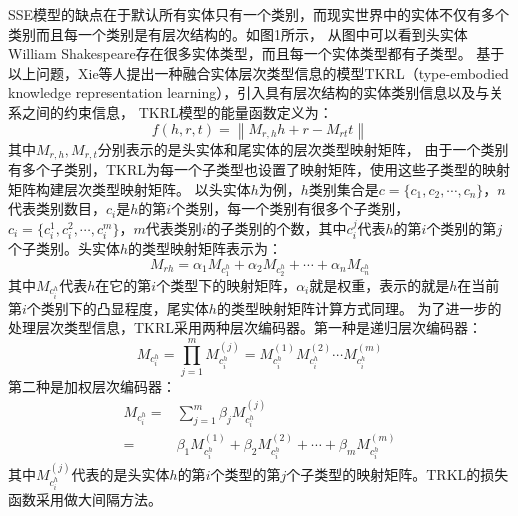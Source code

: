 \documentclass[twocolumn]{article}
\newcommand{\upcite}[1]{\textsuperscript{\textsuperscript{\cite{#1}}}}
\begin{document}
	SSE模型的缺点在于默认所有实体只有一个类别，而现实世界中的实体不仅有多个类别而且每一个类别是有层次结构的。如图1所示，
	从图中可以看到头实体William Shakespeare存在很多实体类型，而且每一个实体类型都有子类型。
	基于以上问题，Xie等人\upcite{TKRL}提出一种融合实体层次类型信息的模型TKRL（type-embodied knowledge representation learning），引入具有层次结构的实体类别信息以及与关系之间的约束信息，
	TKRL模型的能量函数定义为：
	\begin{equation}
		f(h,r,t)=\left \| M_{r,h}h+r-M_{rt}t \right \|
	\end{equation}
	其中$M_{r,h},M_{r,t}$分别表示的是头实体和尾实体的层次类型映射矩阵，
	由于一个类别有多个子类别，TKRL为每一个子类型也设置了映射矩阵，使用这些子类型的映射矩阵构建层次类型映射矩阵。
	以头实体$h$为例，$h$类别集合是$c=\{c_1,c_2,\cdots,c_n\}$，$n$代表类别数目，$c_i$是$h$的第$i$个类别，每一个类别有很多个子类别，$c_i=\{c_i^1,c_i^2,\cdots,c_i^m\}$，$m$代表类别$i$的子类别的个数，其中$c_i^j$代表$h$的第$i$个类别的第$j$个子类别。头实体$h$的类型映射矩阵表示为：
	\begin{equation}
		M_{rh}=\alpha_1 M_{c_1^h}+\alpha_2 M_{c_2^h}+\cdots+\alpha_n M_{c_n^h}
	\end{equation}
	其中$M_{c_i^h}$代表$h$在它的第$i$个类型下的映射矩阵，$\alpha_i$就是权重，表示的就是$h$在当前第$i$个类别下的凸显程度，尾实体$h$的类型映射矩阵计算方式同理。
	为了进一步的处理层次类型信息，TKRL采用两种层次编码器。第一种是递归层次编码器：
	\begin{equation}
		M_{c_i^h}=\prod_{j=1}^{m}M_{c_i^h}^{(j)}=M_{c_i^h}^{(1)}M_{c_i^h}^{(2)}\cdots M_{c_i^h}^{(m)}
	\end{equation}
	第二种是加权层次编码器：
	\begin{equation}
		\begin{split}
		M_{c_i^h}=&\sum_{j=1}^{m}\beta_jM_{c_i^h}^{(j)}\\
		=&\beta_1M_{c_i^h}^{(1)}+\beta_2M_{c_i^h}^{(2)}+\cdots+\beta_mM_{c_i^h}^{(m)}
		\end{split}
	\end{equation}
	其中$M_{c_i^h}^{(j)}$代表的是头实体$h$的第$i$个类型的第$j$个子类型的映射矩阵。TRKL的损失函数采用做大间隔方法。
	
\end{document}

